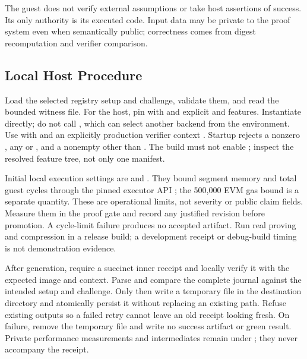 \documentclass[11pt]{article}
\newcommand{\filepath}[1]{\path{#1}}
\begin{document}
The guest does not verify external assumptions or take host assertions of success. Its only authority is its executed code. Input data may be private to the proof system even when semantically public; correctness comes from digest recomputation and verifier comparison.

\subsection{Local Host Procedure}
Load the selected registry setup and challenge, validate them, and read the bounded witness file. For the host, pin  with  and explicit  and  features. Instantiate  directly; do not call , which can select another backend from the environment. Use  with  and an explicitly production verifier context \cite{risc0prover,risc0local}. Startup rejects a nonzero , any  or , and a nonempty  other than . The build must not enable ; inspect the resolved feature tree, not only one manifest.

Initial local execution settings are  and . They bound segment memory and total guest cycles through the pinned executor API \cite{risc0env}; the 500,000 EVM gas bound is a separate quantity. These are operational limits, not severity or public claim fields. Measure them in the proof gate and record any justified revision before promotion. A cycle-limit failure produces no accepted artifact. Run real proving and compression in a release build; a development receipt or debug-build timing is not demonstration evidence.

After generation, require a succinct inner receipt and locally verify it with the expected image and context. Parse and compare the complete journal against the intended setup and challenge. Only then write a temporary file in the destination directory and atomically persist it without replacing an existing path. Refuse existing outputs so a failed retry cannot leave an old receipt looking fresh. On failure, remove the temporary file and write no success artifact or green result. Private performance measurements and intermediates remain under \filepath{.proofsphere-private/}; they never accompany the receipt.
\end{document}
